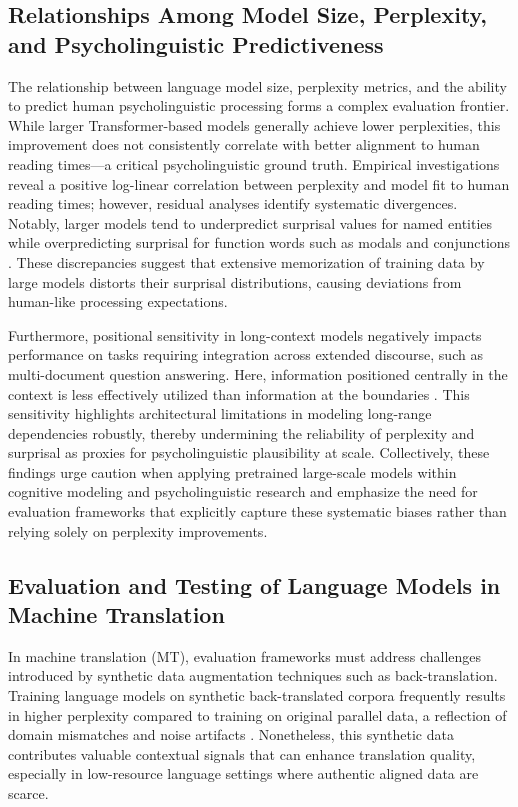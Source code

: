 \documentclass[11pt]{article}
\begin{document}
\subsection{Relationships Among Model Size, Perplexity, and Psycholinguistic Predictiveness}

The relationship between language model size, perplexity metrics, and the ability to predict human psycholinguistic processing forms a complex evaluation frontier. While larger Transformer-based models generally achieve lower perplexities, this improvement does not consistently correlate with better alignment to human reading times—a critical psycholinguistic ground truth. Empirical investigations reveal a positive log-linear correlation between perplexity and model fit to human reading times; however, residual analyses identify systematic divergences. Notably, larger models tend to underpredict surprisal values for named entities while overpredicting surprisal for function words such as modals and conjunctions \cite{ref33,ref35}. These discrepancies suggest that extensive memorization of training data by large models distorts their surprisal distributions, causing deviations from human-like processing expectations.

Furthermore, positional sensitivity in long-context models negatively impacts performance on tasks requiring integration across extended discourse, such as multi-document question answering. Here, information positioned centrally in the context is less effectively utilized than information at the boundaries \cite{ref33}. This sensitivity highlights architectural limitations in modeling long-range dependencies robustly, thereby undermining the reliability of perplexity and surprisal as proxies for psycholinguistic plausibility at scale. Collectively, these findings urge caution when applying pretrained large-scale models within cognitive modeling and psycholinguistic research and emphasize the need for evaluation frameworks that explicitly capture these systematic biases rather than relying solely on perplexity improvements.

\subsection{Evaluation and Testing of Language Models in Machine Translation}

In machine translation (MT), evaluation frameworks must address challenges introduced by synthetic data augmentation techniques such as back-translation. Training language models on synthetic back-translated corpora frequently results in higher perplexity compared to training on original parallel data, a reflection of domain mismatches and noise artifacts \cite{ref37}. Nonetheless, this synthetic data contributes valuable contextual signals that can enhance translation quality, especially in low-resource language settings where authentic aligned data are scarce.
\end{document}
